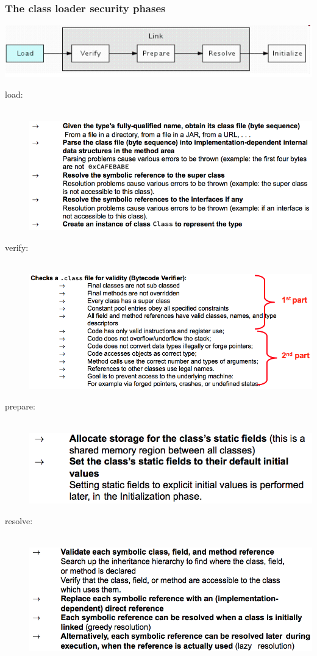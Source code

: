 \documentclass[10pt]{article}
\begin{document}
\subsubsection{The class loader security phases}
\begin{center}
	\includegraphics[scale=0.4]{class-loader.png}
\end{center}
\begin{description}
	\item[load:] \hfill \\ \includegraphics[scale=0.4]{class-loader-load.png}
	\item[verify:] \hfill \\ \includegraphics[scale=0.4]{class-loader-verify.png}
	\item[prepare:] \hfill \\ \includegraphics[scale=0.4]{class-loader-prepare.png}
	\item[resolve:] \hfill \\ \includegraphics[scale=0.4]{class-loader-resolve.png}

\end{description}
\end{document}
